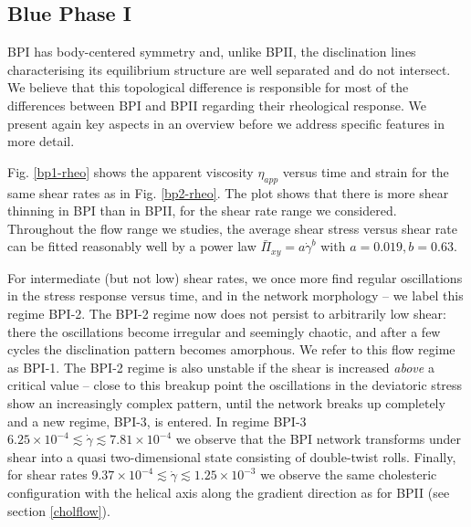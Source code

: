 \documentclass[aps,pre,reprint,superscriptaddress, twocolumn]{revtex4}
\newcommand{\e}[1]{\times10^{#1}}
\newcommand{\gd}{\dot{\gamma}}
\begin{document}
\subsection{Blue Phase I}

BPI has body-centered symmetry and, unlike BPII, the disclination lines
characterising its equilibrium structure are well separated and do not intersect.
We believe that this topological difference is responsible for most of
the differences between BPI and BPII regarding their rheological response. 
We present again key aspects in an overview before we address specific features 
in more detail. 

Fig. \ref{bp1-rheo} shows the apparent viscosity $\eta_{app}$ versus time and 
strain for the same shear rates as in Fig. \ref{bp2-rheo}. The plot
shows that there is more shear thinning in BPI than in BPII, for
the shear rate range we considered. 
Throughout the flow range we studies,
the average shear stress versus shear rate can be fitted reasonably 
well by a power law $\bar{\Pi}_{xy}=a \gd^b$ with $a=0.019, b=0.63$.

For intermediate (but not low) shear rates, we once more find regular oscillations in the stress
response versus time, and in the network morphology -- we label this 
regime BPI-2. 
The BPI-2 regime now does not persist to arbitrarily low shear: there the
oscillations become irregular and seemingly chaotic, and after a few
cycles the disclination pattern becomes amorphous. We refer to this 
flow regime as BPI-1. 
The BPI-2 regime is also unstable if the shear is increased {\em above} 
a critical value -- close to this breakup point the oscillations in the 
deviatoric stress show an increasingly complex
pattern, until the network breaks up completely and a new regime, BPI-3, is entered.
In regime BPI-3 $6.25\e{-4}\lesssim\gd\lesssim7.81\e{-4}$ 
we observe that the BPI network transforms under shear into
a  quasi two-dimensional state consisting of
double-twist rolls.
Finally, for shear rates $9.37\e{-4}\lesssim\gd\lesssim1.25\e{-3}$ we observe the same cholesteric 
configuration with the helical axis along the gradient direction as for BPII (see
section \ref{cholflow}).
 
\end{document}
